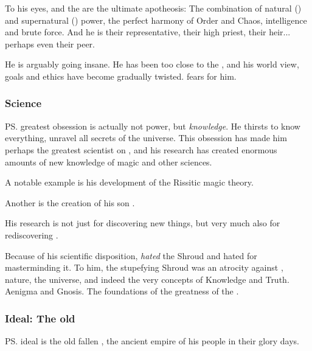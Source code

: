 To his eyes, \Tiamat{} and the \firstgendragons{} are the ultimate apotheosis: The combination of natural (\ophidian) and supernatural (\xzaishannic) power, the perfect harmony of Order and Chaos, intelligence and brute force. And he is their representative, their high priest, their heir... perhaps even their peer. 


He is arguably going insane. 
He has been too close to the \xss, and his world view, goals and ethics have become gradually twisted. 
\Nzessuacrith{} fears for him. 





\subsubsection{Science}
\ps{\Secherdamon} greatest obsession is actually not power, but \emph{knowledge}. He thirsts to know everything, unravel all secrets of the universe. This obsession has made him perhaps the greatest scientist on \Miith{}, and his research has created enormous amounts of new knowledge of magic and other sciences. 

A notable example is his development of the Rissitic magic theory. 

Another is the creation of his son .

His research is not just for discovering new things, but very much also for rediscovering . 

Because of his scientific disposition, \Secherdamon{} \emph{hated} the Shroud and hated \Ishnaruchaefir{} for masterminding it. 
To him, the stupefying Shroud was an atrocity against \Miith, nature, the universe, and indeed the very concepts of Knowledge and Truth. 
Aenigma and Gnosis. 
The foundations of the greatness of the \dzraicchenosses. 





\subsubsection{Ideal: The old \dragonland}
\ps{\Secherdamon} ideal is the old fallen \dragonland, the ancient empire of his people in their glory days. 

